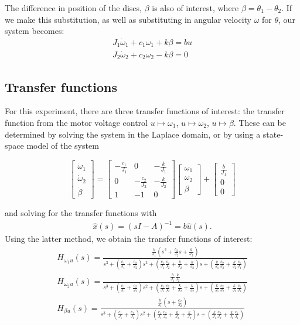 \documentclass[11pt,titlepage]{article}
\begin{document}
	 The difference in position of the discs, $\beta$ is also of interest, where $\beta = \theta_1-\theta_2$. If we make this substitution, as well as substituting in angular velocity $\omega$ for $\dot \theta$, our system becomes:
	 \begin{align}
	 	J_1\dot \omega_1+c_1\omega_1+k\beta=bu \\
		J_2\dot \omega_2+c_2\omega_2-k\beta=0
	 \end{align}
	 
	 \subsection{Transfer functions}
	 For this experiment, there are three transfer functions of interest: the transfer function from the motor voltage control $u\mapsto\omega_1$, $u\mapsto\omega_2$, $u\mapsto\beta$. These can be determined by solving the system in the Laplace domain, or by using a state-space model of the system
	 
	 \[
	\begin{bmatrix}
		\dot \omega_1\\
		\dot \omega_2\\
		\dot \beta
	\end{bmatrix}=
  	\begin{bmatrix}
    		-\frac{c_1}{J_1} & 0 & -\frac{k}{J_1} \\
	    	0 & -\frac{c_2}{J_2} & -\frac{k}{J_2}\\
		1 & -1 & 0
  	\end{bmatrix}
	\begin{bmatrix}
		\omega_1\\
		\omega_2\\
		\beta
	\end{bmatrix}+
	\begin{bmatrix}
		\frac{b}{J_1}\\
		0\\
		0
	\end{bmatrix}
	\]
	
	and solving for the transfer functions with 
	\begin{align}
		\hat{x}(s) = (sI-A)^{-1}=b\hat{u}(s).
	\end{align}
	 Using the latter method, we obtain the transfer functions of interest:\\
	 \begin{align}
	  	H_{\omega_{1}u}(s)= \frac{\frac{b}{J_1}(s^2+\frac{c_2}{J_2}s+\frac{k}{J_2})}{s^3+(\frac{c_1}{J_1}+\frac{c_2}{J_2})s^2+(\frac{c_1}{J_1}\frac{c_2}{J_2}+\frac{k}{J_2}+\frac{k}{J_2})s+(\frac{k}{J_1}\frac{c_2}{J_2}+\frac{k}{J_2}\frac{c_1}{J_1})} \\
	  	H_{\omega_{2}u}(s)= \frac{\frac{b}{J_1}\frac{k}{J_2}}{s^3+(\frac{c_1}{J_1}+\frac{c_2}{J_2})s^2+(\frac{c_1}{J_1}\frac{c_2}{J_2}+\frac{k}{J_2}+\frac{k}{J_2})s+(\frac{k}{J_1}\frac{c_2}{J_2}+\frac{k}{J_2}\frac{c_1}{J_1})}\\
	  	H_{\beta u}(s)=\frac{\frac{b}{J_1}(s+\frac{c_2}{J_2})}{s^3+(\frac{c_1}{J_1}+\frac{c_2}{J_2})s^2+(\frac{c_1}{J_1}\frac{c_2}{J_2}+\frac{k}{J_2}+\frac{k}{J_2})s+(\frac{k}{J_1}\frac{c_2}{J_2}+\frac{k}{J_2}\frac{c_1}{J_1})}
	  \end{align}\\
	  
\end{document}
